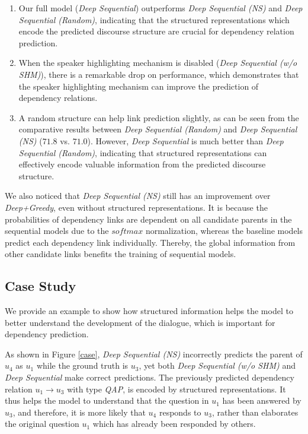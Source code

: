\documentclass[letterpaper]{article} \usepackage{aaai19}  \usepackage{times}  \usepackage{helvet}  \usepackage{courier}  \usepackage{url}  \usepackage{graphicx}  \usepackage{amssymb}
\begin{document}
\begin{enumerate}

\item Our full model (\textit{Deep Sequential}) outperforms \emph{Deep Sequential (NS)} and \emph{Deep Sequential (Random)}, indicating that the structured representations which encode the predicted discourse structure are crucial for dependency relation prediction.
    
\item When the speaker highlighting mechanism is disabled (\emph{Deep Sequential (w/o SHM)}), there is a remarkable drop on performance, which demonstrates that the speaker highlighting mechanism can improve the prediction of dependency relations.

\item A random structure can help link prediction slightly, as can be seen from the comparative results between \emph{Deep Sequential (Random)} and \emph{Deep Sequential (NS)} ($71.8$ vs. $71.0$).
However, \emph{Deep Sequential} is much better than \emph{Deep Sequential (Random)}, indicating that structured representations can effectively encode valuable information from the predicted discourse structure.
\end{enumerate}    
    
We also noticed that \emph{Deep Sequential (NS)} still has an improvement over \emph{Deep+Greedy}, even without structured representations.
It is because the probabilities of dependency links are dependent on all candidate parents in the sequential models due to the $softmax$ normalization, whereas the baseline models predict each dependency link individually.
Thereby, the global information from other candidate links benefits the training of sequential models.

\subsection{Case Study}
We provide an example to show how structured information helps the model to better understand the development of the dialogue, which is important for dependency prediction.

As shown in Figure \ref{case}, \emph{Deep Sequential (NS)} incorrectly predicts the parent of $u_4$ as $u_1$ while the ground truth is $u_3$, yet both \emph{Deep Sequential (w/o SHM)} and \emph{Deep Sequential} make correct predictions.
The previously predicted dependency relation $u_1\rightarrow u_3$ with type \emph{QAP}, is encoded by structured representations.
It thus helps the model to understand that the question in $u_1$ has been answered by $u_3$, and therefore, it is more likely that $u_4$ responds to $u_3$, rather than elaborates the original question $u_1$ which has already been responded by others.
\end{document}
